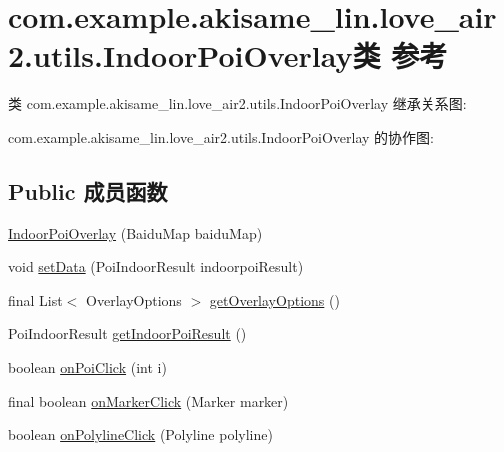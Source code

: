\hypertarget{classcom_1_1example_1_1akisame__lin_1_1love__air2_1_1utils_1_1_indoor_poi_overlay}{}\section{com.\+example.\+akisame\+\_\+lin.\+love\+\_\+air2.\+utils.\+Indoor\+Poi\+Overlay类 参考}
\label{classcom_1_1example_1_1akisame__lin_1_1love__air2_1_1utils_1_1_indoor_poi_overlay}


类 com.\+example.\+akisame\+\_\+lin.\+love\+\_\+air2.\+utils.\+Indoor\+Poi\+Overlay 继承关系图\+:


com.\+example.\+akisame\+\_\+lin.\+love\+\_\+air2.\+utils.\+Indoor\+Poi\+Overlay 的协作图\+:
\subsection*{Public 成员函数}
\begin{DoxyCompactItemize}
\item 
\mbox{\hyperlink{classcom_1_1example_1_1akisame__lin_1_1love__air2_1_1utils_1_1_indoor_poi_overlay_a2d68adced3e033820fbd71626d1434aa}{Indoor\+Poi\+Overlay}} (Baidu\+Map baidu\+Map)
\item 
void \mbox{\hyperlink{classcom_1_1example_1_1akisame__lin_1_1love__air2_1_1utils_1_1_indoor_poi_overlay_adc5973f77fc412b509497bc3b2b96cdb}{set\+Data}} (Poi\+Indoor\+Result indoorpoi\+Result)
\item 
final List$<$ Overlay\+Options $>$ \mbox{\hyperlink{classcom_1_1example_1_1akisame__lin_1_1love__air2_1_1utils_1_1_indoor_poi_overlay_a96d71006ff87f0bf96a939ed0c435f13}{get\+Overlay\+Options}} ()
\item 
Poi\+Indoor\+Result \mbox{\hyperlink{classcom_1_1example_1_1akisame__lin_1_1love__air2_1_1utils_1_1_indoor_poi_overlay_ae0e6650e5ffc9441dc83299277750af1}{get\+Indoor\+Poi\+Result}} ()
\item 
boolean \mbox{\hyperlink{classcom_1_1example_1_1akisame__lin_1_1love__air2_1_1utils_1_1_indoor_poi_overlay_af832b3ec4074cee690f87bd7b1e32d8a}{on\+Poi\+Click}} (int i)
\item 
final boolean \mbox{\hyperlink{classcom_1_1example_1_1akisame__lin_1_1love__air2_1_1utils_1_1_indoor_poi_overlay_a862e11ef62374cb3cd29046eedbcce90}{on\+Marker\+Click}} (Marker marker)
\item 
boolean \mbox{\hyperlink{classcom_1_1example_1_1akisame__lin_1_1love__air2_1_1utils_1_1_indoor_poi_overlay_a3bee595e62a1427db7cb436189695148}{on\+Polyline\+Click}} (Polyline polyline)
\end{DoxyCompactItemize}
